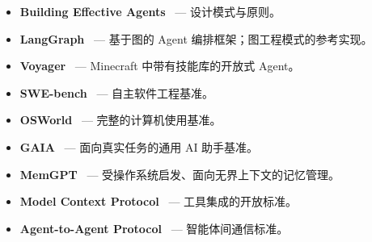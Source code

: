 \begin{itemize}
  \item \textbf{Building Effective Agents}~\cite{anthropic2024buildingagents} --- 设计模式与原则。
  \item \textbf{LangGraph}~\cite{langchain2024langgraph} --- 基于图的 Agent 编排框架；图工程模式的参考实现。
  \item \textbf{Voyager}~\cite{wang2023voyager} --- Minecraft 中带有技能库的开放式 Agent。
  \item \textbf{SWE-bench}~\cite{jimenez2024swebench} --- 自主软件工程基准。
  \item \textbf{OSWorld}~\cite{xie2024osworld} --- 完整的计算机使用基准。
  \item \textbf{GAIA}~\cite{mialon2023gaia} --- 面向真实任务的通用 AI 助手基准。
  \item \textbf{MemGPT}~\cite{packer2023memgpt} --- 受操作系统启发、面向无界上下文的记忆管理。
  \item \textbf{Model Context Protocol}~\cite{anthropic-mcp-2024} --- 工具集成的开放标准。
  \item \textbf{Agent-to-Agent Protocol}~\cite{google-a2a-2025} --- 智能体间通信标准。
\end{itemize}

